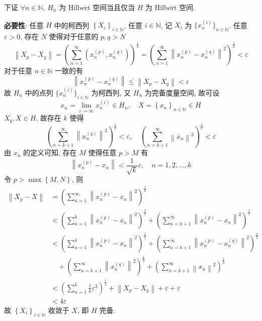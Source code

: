 \documentclass[\ROOT/main.tex]{subfiles}
\begin{document}
下证 $\forall n \in \mathbb{N}$, $H_n$ 为 Hilbert 空间当且仅当 $H$ 为 Hilbert 空间.

\noindent \textbf{必要性}:
任意 $H$ 中的柯西列 $\left\{ X_i \right\}_{i \in \mathbb{N}}$,
任意 $i \in \mathbb{N}$, 记 $X_i $ 为 $\{ x_n^{\left( i \right)} \}_{n \in \mathbb{N}}$.
任意 $\varepsilon > 0$, 存在 $N$ 使得对于任意的 $p, q> N$
\[
    \left\| X_p - X_q \right\|
    = \left( \sum_{n = 1}^{\infty} \left( x_n^{\left( p \right)}, x_n^{\left( q \right)} \right) \right)^{\frac{1}{2}}
    = \left( \sum_{n = 1}^{\infty} \left\| x_n^{\left( p \right)} - x_n^{\left( q \right)} \right\|^2 \right)^{\frac{1}{2}}
    < \varepsilon
\]
对于任意 $n \in \mathbb{N}$ 一致的有
\[
    \left\| x_n^{\left( p \right)} - x_n^{\left( q \right)} \right\| \leqslant \left\| X_p - X_q \right\| < \varepsilon
\]
故 $H_n$ 中的点列 $\{ x_n^{\left( i \right)} \}_{i \in \mathbb{N}}$ 为柯西列,
又 $H_n$ 为完备度量空间, 故可设
\[
    x_n = \lim_{i \to \infty} x_n^{\left( i \right)}\in H_n
    , \quad
    X = \left\{ x_n \right\}_{n \in \mathbb{N}} \in H
\]
$X_q, X \in H$, 故存在 $k$ 使得
\[
    \left( \sum_{n = k + 1}^{\infty} \left\| x_n^{\left( q \right)} \right\|^2 \right)^{\frac{1}{2}} < \varepsilon
    , \quad
    \left( \sum_{n = k + 1}^{\infty} \left\| x_n \right\|^2 \right)^{\frac{1}{2}} < \varepsilon
\]
由 $x_n$ 的定义可知, 存在 $M$ 使得任意 $p > M$ 有
\[
    \left\| x_n^{\left( p \right)} - x_n \right\| < \frac{1}{\sqrt{k}} \varepsilon
    , \quad
    n = 1, 2, \dots, k
\]
令 $p > \max \left\{ M, N \right\}$, 则
\begin{align*}
    \left\| X_p - X \right\|
    &= \left( \sum_{n = 1}^{\infty} \left\| x_n^{\left( p \right)} - x_n \right\|^2 \right)^{\frac{1}{2}} \\
    &< \left( \sum_{n = 1}^{k} \left\| x_n^{\left( p \right)} - x_n \right\|^2 \right)^{\frac{1}{2}}
        + \left( \sum_{n = k + 1}^{\infty} \left\| x_n^{\left( p \right)} - x_n \right\|^2 \right)^{\frac{1}{2}} \\
    &< \left( \sum_{n = 1}^{k} \left\| x_n^{\left( p \right)} - x_n \right\|^2 \right)^{\frac{1}{2}}
        + \left( \sum_{n = k + 1}^{\infty} \left\| x_n^{\left( p \right)} - x_n^{\left( q \right)} \right\|^2 \right)^{\frac{1}{2}} \\
    &\quad + \left( \sum_{n = k + 1}^{\infty} \left\| x_n^{\left( q \right)} \right\|^2 \right)^{\frac{1}{2}}
        + \left( \sum_{n = k + 1}^{\infty} \left\| x_n \right\|^2 \right)^{\frac{1}{2}} \\
    &< \left( \sum_{n = 1}^{k} \frac{1}{k} \varepsilon^2 \right)^{\frac{1}{2}} + \left\| X_p - X_q \right\| + \varepsilon + \varepsilon \\
    &< 4 \varepsilon
\end{align*}
故 $\left\{ X_i \right\}_{i \in \mathbb{N}}$ 收敛于 $X$, 即 $H$ 完备.
\end{document}
